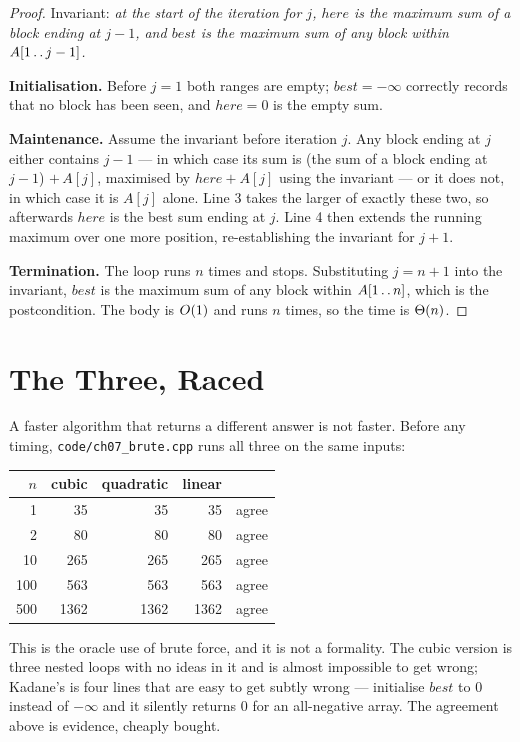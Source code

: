 \begin{proof}
Invariant: \emph{at the start of the iteration for $j$, $\mathit{here}$ is the
maximum sum of a block ending at $j-1$, and $\mathit{best}$ is the maximum sum
of any block within $A[1 \mathinner{\ldotp\ldotp} j-1]$.}

\smallskip
\textbf{Initialisation.} Before $j = 1$ both ranges are empty;
$\mathit{best} = -\infty$ correctly records that no block has been seen, and
$\mathit{here} = 0$ is the empty sum.

\smallskip
\textbf{Maintenance.} Assume the invariant before iteration $j$. Any block
ending at $j$ either contains $j-1$ --- in which case its sum is (the sum of a
block ending at $j-1$) $+\, A[j]$, maximised by $\mathit{here} + A[j]$ using
the invariant --- or it does not, in which case it is $A[j]$ alone. Line 3
takes the larger of exactly these two, so afterwards $\mathit{here}$ is the
best sum ending at $j$. Line 4 then extends the running maximum over one more
position, re-establishing the invariant for $j+1$.

\smallskip
\textbf{Termination.} The loop runs $n$ times and stops. Substituting $j = n+1$
into the invariant, $\mathit{best}$ is the maximum sum of any block within
$A[1\mathinner{\ldotp\ldotp}n]$, which is the postcondition. The body is
$O(1)$ and runs $n$ times, so the time is $\Theta(n)$.
\end{proof}

\section{The Three, Raced}

\begin{worked}
A faster algorithm that returns a different answer is not faster. Before any
timing, \texttt{code/ch07\_brute.cpp} runs all three on the same inputs:

\begin{center}
\begin{tabular}{@{}rrrrl@{}}
\toprule
\rowcolor{primary!15}
$n$ & cubic & quadratic & linear & \\
\midrule
  1 &   35 &   35 &   35 & agree \\
  2 &   80 &   80 &   80 & agree \\
 10 &  265 &  265 &  265 & agree \\
100 &  563 &  563 &  563 & agree \\
500 & 1362 & 1362 & 1362 & agree \\
\bottomrule
\end{tabular}
\end{center}

\smallskip
This is the oracle use of brute force, and it is not a formality. The cubic
version is three nested loops with no ideas in it and is almost impossible to
get wrong; Kadane's is four lines that are easy to get subtly wrong --- initialise
$\mathit{best}$ to $0$ instead of $-\infty$ and it silently returns $0$ for an
all-negative array. The agreement above is evidence, cheaply bought.
\end{worked}

